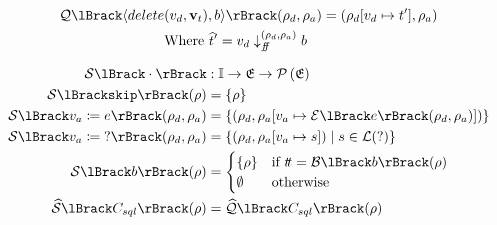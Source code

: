 \begin{align}
    \sqlsem{\langle delete&(v_d, \mathbf{v}_t), b \rangle} (\rho_d, \rho_a) = (\rho_d[v_d \mapsto t'], \rho_a) \\
    &\text{Where }\abstable' = v_d \downarrow_{\false}^{(\rho_d, \rho_a)} b
\end{align}

\begin{align}
    \sem{\cdot} &: \instructions \rightarrow \environments \rightarrow \powerset{\environments} \\
    \sem{\texttt{skip}}(\environment) &= \left\{ \environment \right\} \\
    \sem{v_a \coloneqq e}(\environment_d, \environment_a) &= \left\{(\environment_d, \environment_a[v_a \mapsto \expsem{e}(\environment_d, \environment_a)]) \right\} \\
    \sem{v_a \coloneqq \; ?}(\environment_d, \environment_a) &= \left\{(\environment_d, \environment_a[v_a \mapsto s]) \mid s \in \lang(?) \right\} \\
    \sem{b}(\environment) &= \begin{cases}
        \{\environment\} & \text{if } \true = \boolsem{b}(\environment) \\
        \emptyset & \text{otherwise}
    \end{cases} \\
    \abssem{C_{sql}}(\environment) &= \abssqlsem{C_{sql}}(\environment)
\end{align}
